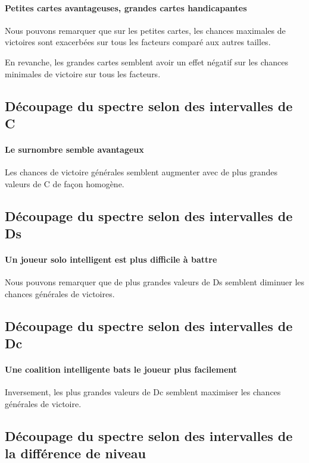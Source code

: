 \paragraph{Petites cartes avantageuses, grandes cartes handicapantes}
Nous pouvons remarquer que sur les petites cartes, les chances maximales de victoires sont exacerbées sur tous les facteurs comparé aux autres tailles.

En revanche, les grandes cartes semblent avoir un effet négatif sur les chances minimales de victoire sur tous les facteurs. 

\subsection{Découpage du spectre selon des intervalles de C}
\paragraph{Le surnombre semble avantageux}
Les chances de victoire générales semblent augmenter avec de plus grandes valeurs de C de façon homogène.


\subsection{Découpage du spectre selon des intervalles de Ds}
\paragraph{Un joueur solo intelligent est plus difficile à battre}
Nous pouvons remarquer que de plus grandes valeurs de Ds semblent diminuer les chances générales de victoires.

\subsection{Découpage du spectre selon des intervalles de Dc}
\paragraph{Une coalition intelligente bats le joueur plus facilement}
Inversement, les plus grandes valeurs de Dc semblent maximiser les chances générales de victoire.


\subsection{Découpage du spectre selon des intervalles de la différence de niveau}
